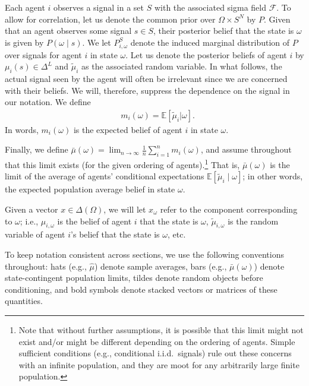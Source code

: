 \documentclass[12pt,reqno]{amsart}
\newcommand{\tmu}{\tilde{\mu}}
\begin{document}
Each agent $i$ observes a signal in a set $S$ with the associated sigma field $\mathcal{F}$. To allow for correlation, let us denote the common prior over $\Omega \times S^N$ by $P$. Given that an agent observes some signal $s \in S$, their posterior belief that the state is $\omega$ is given by $P(\omega\mid s)$. We let $P_{i,\omega}^S$ denote the induced marginal distribution of $P$ over signals for agent $i$ in state $\omega$. Let us denote the posterior beliefs of agent $i$ by $\mu_i(s) \in \Delta^L$ and $\tmu_i$ as the associated random variable. In what follows, the actual signal seen by the agent will often be irrelevant since we are concerned with their beliefs. We will, therefore, suppress the dependence on the signal in our notation. We define
\begin{align*}
    &m_i(\omega) = \mathbb{E}[\tmu_i|\omega].
\end{align*}
In words, $m_i(\omega)$ is the expected belief of agent $i$ in state $\omega$. 

Finally, we define $\bar{\mu}(\omega) = \lim_{n \to \infty} \frac1n \sum_{i=1}^nm_i(\omega)$, and assume throughout that this limit exists (for the given ordering of agents).\footnote{Note that without further assumptions, it is possible that this limit might not exist and/or might be different depending on the ordering of agents.  Simple sufficient conditions (e.g., conditional i.i.d.\ signals) rule out these concerns with an infinite population, and they are moot for any arbitrarily large finite population.} That is, $\bar{\mu}(\omega)$ is the limit of the average of agents' conditional expectations $\mathbb{E}[\tilde{\mu}_i\mid\omega]$; in other words, the expected population average belief in state $\omega$.

Given a vector $x \in \Delta(\Omega)$, we will let $x_{\omega}$ refer to the component corresponding to $\omega$; i.e., $\mu_{i,\omega}$ is the belief of agent $i$ that the state is $\omega$, $\tmu_{i,\omega}$ is the random variable of agent $i$'s belief that the state is $\omega$, etc.

To keep notation consistent across sections, we use the following conventions throughout: hats (e.g., $\hat\mu$) denote sample averages, bars (e.g., $\bar\mu(\omega)$) denote state-contingent population limits, tildes denote random objects before conditioning, and bold symbols denote stacked vectors or matrices of these quantities.
\end{document}
